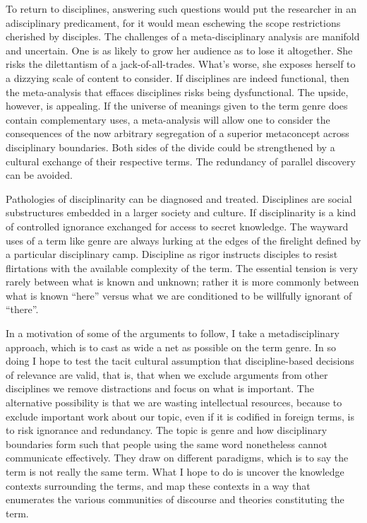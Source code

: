 \documentclass[]{book}
\theoremstyle{definition}
\theoremstyle{definition}
\theoremstyle{definition}
\theoremstyle{remark}
\begin{document}
To return to disciplines, answering such questions would put the
researcher in an adisciplinary predicament, for it would mean eschewing
the scope restrictions cherished by disciples. The challenges of a
meta-disciplinary analysis are manifold and uncertain. One is as likely
to grow her audience as to lose it altogether. She risks the
dilettantism of a jack-of-all-trades. What's worse, she exposes herself
to a dizzying scale of content to consider. If disciplines are indeed
functional, then the meta-analysis that effaces disciplines risks being
dysfunctional. The upside, however, is appealing. If the universe of
meanings given to the term genre does contain complementary uses, a
meta-analysis will allow one to consider the consequences of the now
arbitrary segregation of a superior metaconcept across disciplinary
boundaries. Both sides of the divide could be strengthened by a cultural
exchange of their respective terms. The redundancy of parallel discovery
can be avoided.

Pathologies of disciplinarity can be diagnosed and treated. Disciplines
are social substructures embedded in a larger society and culture. If
disciplinarity is a kind of controlled ignorance exchanged for access to
secret knowledge. The wayward uses of a term like genre are always
lurking at the edges of the firelight defined by a particular
disciplinary camp. Discipline as rigor instructs disciples to resist
flirtations with the available complexity of the term. The essential
tension is very rarely between what is known and unknown; rather it is
more commonly between what is known ``here'' versus what we are
conditioned to be willfully ignorant of ``there''.

In a motivation of some of the arguments to follow, I take a
metadisciplinary approach, which is to cast as wide a net as possible on
the term genre. In so doing I hope to test the tacit cultural assumption
that discipline-based decisions of relevance are valid, that is, that
when we exclude arguments from other disciplines we remove distractions
and focus on what is important. The alternative possibility is that we
are wasting intellectual resources, because to exclude important work
about our topic, even if it is codified in foreign terms, is to risk
ignorance and redundancy. The topic is genre and how disciplinary
boundaries form such that people using the same word nonetheless cannot
communicate effectively. They draw on different paradigms, which is to
say the term is not really the same term. What I hope to do is uncover
the knowledge contexts surrounding the terms, and map these contexts in
a way that enumerates the various communities of discourse and theories
constituting the term.
\end{document}
